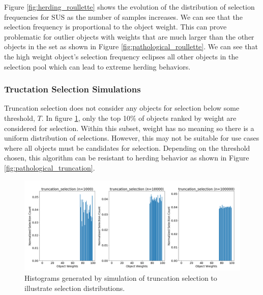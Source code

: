 \documentclass[12pt]{article}
\begin{document}
    Figure \ref{fig:herding_roullette} shows the evolution of the
    distribution of selection frequencies for SUS as the number of samples
    increases. We can see that the selection frequency is proportional to the
    object weight. This can prove problematic for outlier objects with weights
    that are much larger than the other objects in the set as shown in Figure
    \ref{fig:pathological_roullette}. We can see that the high weight object's
    selection frequency eclipses all other objects in the selection pool which
    can lead to extreme herding behaviors.

    \subsubsection{Tructation Selection Simulations}
    Truncation selection \cite{truncation1973} does not consider any objects
    for selection below some threshold, $T$. In figure
    \ref{fig:herding_truncation}, only the top 10\% of objects ranked by weight
    are considered for selection. Within this subset, weight has no meaning so
    there is a uniform distribution of selections. However, this may not be
    suitable for use cases where all objects must be candidates for selection.
    Depending on the threshold chosen, this algorithm can be resistant to
    herding behavior as shown in Figure \ref{fig:pathological_truncation}. 

    \begin{figure}[htbp]
      \centering
      \includegraphics[scale=0.32]{images/herding_truncation.png} 
      \caption{Histograms generated by simulation of truncation selection
               to illustrate selection distributions.}
      \label{fig:herding_truncation}
    \end{figure}
\end{document}
